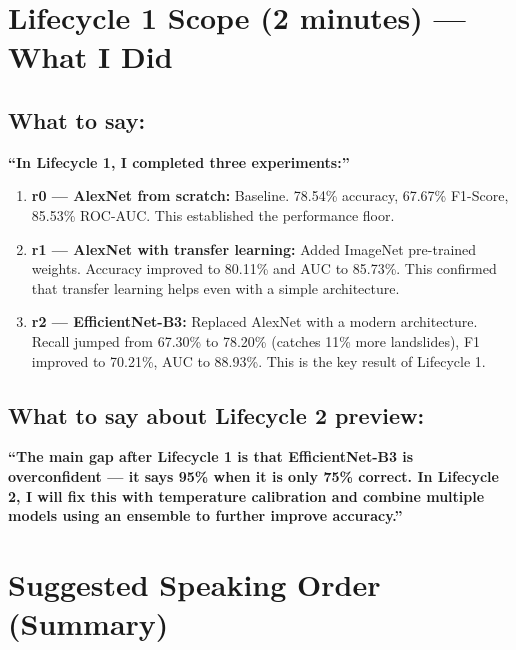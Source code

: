 \documentclass[11pt]{article}
\begin{document}
\section{Lifecycle 1 Scope (2 minutes) --- What I Did}

\subsection{What to say:}

\textbf{``In Lifecycle 1, I completed three experiments:''}

\begin{enumerate}
    \item \textbf{r0 --- AlexNet from scratch:} Baseline. 78.54\% accuracy, 67.67\% F1-Score, 85.53\% ROC-AUC. This established the performance floor.

    \item \textbf{r1 --- AlexNet with transfer learning:} Added ImageNet pre-trained weights. Accuracy improved to 80.11\% and AUC to 85.73\%. This confirmed that transfer learning helps even with a simple architecture.

    \item \textbf{r2 --- EfficientNet-B3:} Replaced AlexNet with a modern architecture. Recall jumped from 67.30\% to 78.20\% (catches 11\% more landslides), F1 improved to 70.21\%, AUC to 88.93\%. This is the key result of Lifecycle 1.
\end{enumerate}

\subsection{What to say about Lifecycle 2 preview:}

\textbf{``The main gap after Lifecycle 1 is that EfficientNet-B3 is overconfident --- it says 95\% when it is only 75\% correct. In Lifecycle 2, I will fix this with temperature calibration and combine multiple models using an ensemble to further improve accuracy.''}

\section{Suggested Speaking Order (Summary)}
\end{document}
